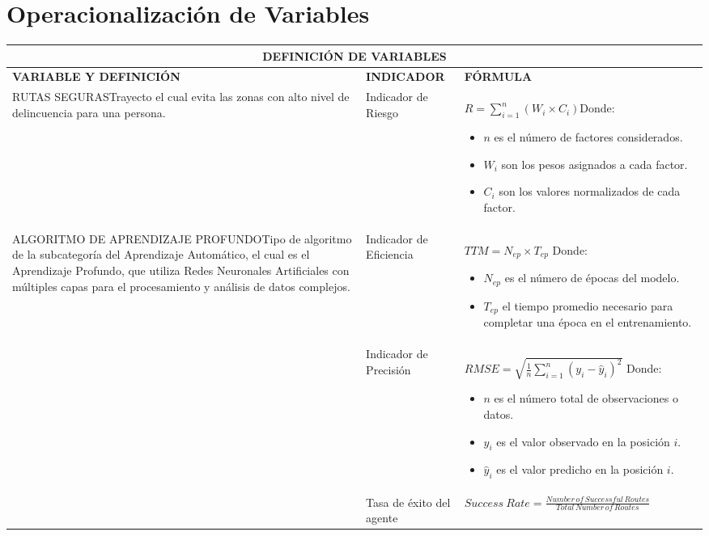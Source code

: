 \section{Operacionalización de Variables}
\begin{table}[h!]
	\centering
	\small
	\begin{tabularx}{\textwidth}{|X|X|X|}
		\hline
		\multicolumn{3}{|c|}{\textbf{DEFINICIÓN DE VARIABLES}} \\
		\hline
		\textbf{VARIABLE Y DEFINICIÓN} & \textbf{INDICADOR} & \textbf{FÓRMULA} \\
		\hline
		RUTAS SEGURAS\newline Trayecto el cual evita las zonas con alto nivel de delincuencia para una persona. & Indicador de Riesgo & $R = \sum _{i=1}^{n}(W_{i}\times C_{i})$\newline Donde: 
		\begin{itemize}
			\item $n$ es el número de factores considerados.
			\item $W_{i}$ son los pesos asignados a cada factor.
			\item $C_{i}$ son los valores normalizados de cada factor.
		\end{itemize} \\
		\hline
		\multirow{3}{\hsize}{ALGORITMO DE APRENDIZAJE PROFUNDO\newline Tipo de algoritmo de la subcategoría del Aprendizaje Automático, el cual es el Aprendizaje Profundo, que utiliza Redes Neuronales Artificiales con múltiples capas para el procesamiento y análisis de datos complejos.} & Indicador de Eficiencia & $TTM = N_{ep} \times T_{ep}$ \newline Donde: 
		\begin{itemize}
			\item $N_{ep}$ es el número de épocas del modelo.
			\item $T_{ep}$ el tiempo promedio necesario para completar una época en el entrenamiento.
		\end{itemize}\\
		\cline{2-3}
		& Indicador de Precisión & $RMSE = \sqrt{\frac{1}{n}\sum _{i = 1}^{n}(y_{i}-\hat{y}_{i})^{2}}$ \newline Donde: 
		\begin{itemize}
			\item $n$ es el número total de observaciones o datos.
			\item $y_{i}$ es el valor observado en la posición $i$.
			\item $\hat{y}_{i}$ es el valor predicho en la posición $i$.
		\end{itemize}\\
		\cline{2-3}
		& Tasa de éxito del agente & $Success\: Rate = \frac{Number\,of \, Successful\,Routes}{Total\,Number\,of \, Routes}$ \\
		\hline
	\end{tabularx}
\end{table}
